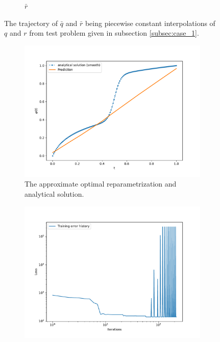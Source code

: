 \begin{figure}[b]
\begin{subfigure}[t]{0.5\textwidth}
        \caption{\(\bar r\)}\label{fig:curve_1_pc_r}
    \end{subfigure}
    \caption{The trajectory of \(\bar q\) and \(\bar r\) being piecewise constant interpolations of  \(q\) and  \(r\) from test problem  given in subsection \ref{subsec:case_1}.}\label{fig:curve_1_pc}
\end{figure}

\begin{figure}[t]
    \begin{subfigure}[t]{0.5\textwidth}
        \centering
        \includegraphics[width=\linewidth]{figures/curve_1_pc/eks_2/plot_0_0.pdf}
        \caption{The approximate optimal reparametrization and analytical solution.}\label{fig:curve_1_pc_solution}
    \end{subfigure}
    \begin{subfigure}[t]{0.5\textwidth}
        \centering
        \includegraphics[width=\linewidth]{figures/curve_1_pc/eks_2/history_plot_0.pdf}

\end{subfigure}
\end{figure}
